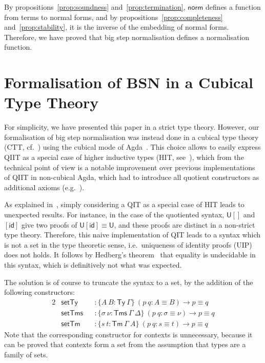 \documentclass[a4paper,english]{lipics-v2019}
\newcommand{\agdaSymb}[1]{\mathsf{#1}}
\newcommand{\Ty}{\agdaSymb{Ty}}
\newcommand{\Tms}{\agdaSymb{Tms}}
\newcommand{\Tm}{\agdaSymb{Tm}}
\newcommand{\id}{\agdaSymb{id}}
\newcommand{\norm}{\agdaSymb{norm}}
\newcommand{\U}{\agdaSymb{U}}
\newcommand{\isSet}{\agdaSymb{set}}
\begin{document}
By propositions~\ref{prop:soundness} and~\ref{prop:termination}, $\norm$ defines a
function from terms to normal forms, and by propositions~\ref{prop:completeness}
and~\ref{prop:stability}, it is the inverse of the embedding of normal forms.
Therefore, we have proved that big step normalisation defines a normalisation
function.

\section{Formalisation of BSN in a Cubical Type Theory}
\label{sec:cubical}
For simplicity, we have presented this paper in a strict type theory. However,
our formalisation of big step normalisation was instead done in a cubical type
theory (CTT, cf.~\cite{cchm}) using the cubical mode of Agda~\cite{norell2007agda}.
This choice allows to easily express QIIT as a special case of higher inductive
types (HIT, see~\cite{hott}), which from the technical point of view is a
notable improvement over previous implementations of QIIT in non-cubical Agda,
which had to introduce all quotient constructors as additional axioms
(e.g.~\cite{kaposi2016normalisation}).

As explained in~\cite{kaposi2016type}, simply considering a QIT as a special
case of HIT leads to unexpected results. For instance, in the case of the
quotiented syntax, $\U[]$ and $[\id]$ give two proofs of $\U[\id] \equiv \U$,
and these proofs are distinct in a non-strict type theory. Therefore, this naive
implementation of QIT leads to a syntax which is not a set in the type theoretic
sense, i.e.\ uniqueness of identity proofs (UIP) does not holds.
It follows by Hedberg's theorem~\cite{hedberg1998coherence} that equality is
undecidable in this syntax, which is definitively not what was expected.

The solution is of course to truncate the syntax to a set, by the addition of
the following constructors:
\begin{alignat*}{2}
  & \isSet\Ty && : \{A\ B : \Ty\ \Gamma\}\ (p\ q : A \equiv B) \to p \equiv q \\
  & \isSet\Tms && : \{\sigma\ \nu : \Tms\ \Gamma\ \Delta\}\ (p\ q : \sigma \equiv \nu) \to p \equiv q \\
  & \isSet\Tm && : \{s\ t : \Tm\ \Gamma\ A\}\ (p\ q : s \equiv t) \to p \equiv q
\end{alignat*}
Note that the corresponding constructor for contexts is unnecessary, because
it can be proved that contexts form a set from the assumption that types are a
family of sets.
\end{document}
